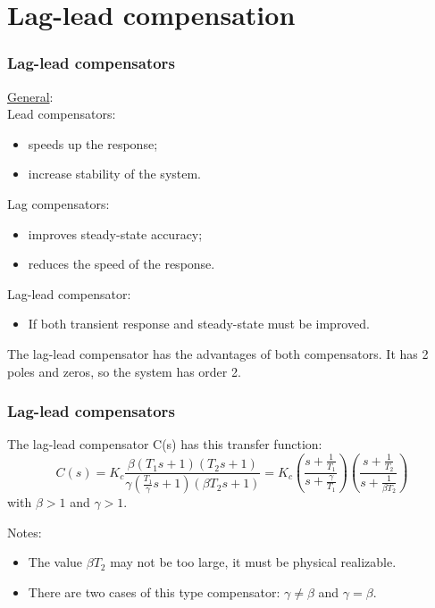\section{Lag-lead compensation}

\begin{frame}
	\frametitle{Lag-lead compensators}
		\underline{General}:\\
		Lead compensators: 
		\begin{itemize}
			\item speeds up the response;
			\item increase stability of the system.
		\end{itemize}
		Lag compensators:
		\begin{itemize}
			\item improves steady-state accuracy;
			\item reduces the speed of the response.
		\end{itemize}
		Lag-lead compensator:
		\begin{itemize}
			\item If both transient response and steady-state must be improved.
		\end{itemize}
		The lag-lead compensator has the advantages of both compensators. It has 2 poles and zeros, so the system has order 2.
\end{frame}

\begin{frame}
	\frametitle{Lag-lead compensators}
	The lag-lead compensator C(s) has this transfer function: 
	$$C(s)=K_c\frac{\beta (T_1s+1)(T_2s+1)}{\gamma (\frac{T_1}{\gamma}s+1)(\beta T_2s+1)}=
	K_c\left(\frac{s+\frac{1}{T_1}}{s+\frac{\gamma}{T_1}}\right)
	\left(\frac{s+\frac{1}{T_2}}{s+\frac{1}{\beta T_2}}\right)$$ with $\beta>1$ and $\gamma>1$.\vspace{4mm}
	
	Notes:
	\begin{itemize}
		\item The value $\beta T_2$ may not be too large, it must be physical realizable.
		\item  There are two cases of this type compensator: $\gamma\neq \beta$ and $\gamma= \beta$.
	\end{itemize}
\end{frame}

